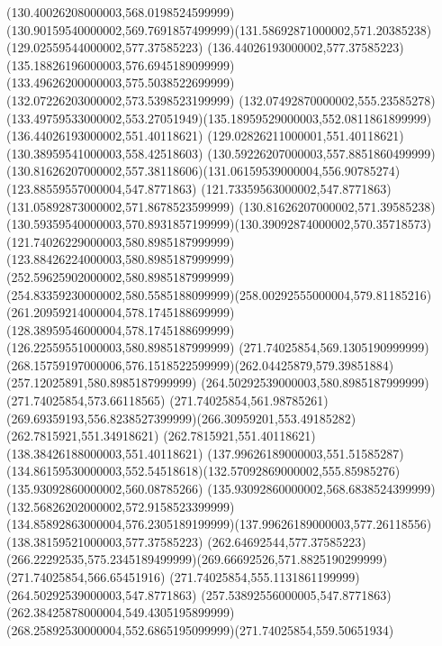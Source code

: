 {{	\curveto(130.40026208000003,568.0198524599999)(130.90159540000002,569.7691857499999)(131.58692871000002,571.20385238)
	\closepath
	\moveto(129.02559544000002,577.37585223)
	\lineto(136.44026193000002,577.37585223)
	\curveto(135.18826196000003,576.6945189099999)(133.49626200000003,575.5038522699999)(132.07226203000002,573.5398523199999)
	\closepath
	\moveto(132.07492870000002,555.23585278)
	\curveto(133.49759533000002,553.27051949)(135.18959529000003,552.0811861899999)(136.44026193000002,551.40118621)
	\lineto(129.02826211000001,551.40118621)
	\closepath
	\moveto(130.38959541000003,558.42518603)
	\curveto(130.59226207000003,557.8851860499999)(130.81626207000002,557.38118606)(131.06159539000004,556.90785274)
	\lineto(123.88559557000004,547.8771863)
	\lineto(121.73359563000002,547.8771863)
	\closepath
	\moveto(131.05892873000002,571.8678523599999)
	\curveto(130.81626207000002,571.39585238)(130.59359540000003,570.8931857199999)(130.39092874000002,570.35718573)
	\lineto(121.74026229000003,580.8985187999999)
	\lineto(123.88426224000003,580.8985187999999)
	\closepath
	\moveto(252.59625902000002,580.8985187999999)
	\curveto(254.83359230000002,580.5585188099999)(258.00292555000004,579.81185216)(261.20959214000004,578.1745188699999)
	\lineto(128.38959546000004,578.1745188699999)
	\lineto(126.22559551000003,580.8985187999999)
	\closepath
	\moveto(271.74025854,569.1305190999999)
	\curveto(268.15759197000006,576.1518522599999)(262.04425879,579.39851884)(257.12025891,580.8985187999999)
	\lineto(264.50292539000003,580.8985187999999)
	\lineto(271.74025854,573.66118565)
	\closepath
	\moveto(271.74025854,561.98785261)
	\curveto(269.69359193,556.8238527399999)(266.30959201,553.49185282)(262.7815921,551.34918621)
	\lineto(262.7815921,551.40118621)
	\lineto(138.38426188000003,551.40118621)
	\curveto(137.99626189000003,551.51585287)(134.86159530000003,552.54518618)(132.57092869000002,555.85985276)
	\lineto(135.93092860000002,560.08785266)
	\lineto(135.93092860000002,568.6838524399999)
	\lineto(132.56826202000002,572.9158523399999)
	\curveto(134.85892863000004,576.2305189199999)(137.99626189000003,577.26118556)(138.38159521000003,577.37585223)
	\lineto(262.64692544,577.37585223)
	\curveto(266.22292535,575.2345189499999)(269.66692526,571.8825190299999)(271.74025854,566.65451916)
	\closepath
	\moveto(271.74025854,555.1131861199999)
	\lineto(264.50292539000003,547.8771863)
	\lineto(257.53892556000005,547.8771863)
	\curveto(262.38425878000004,549.4305195899999)(268.25892530000004,552.6865195099999)(271.74025854,559.50651934)
	\closepath
}
}
